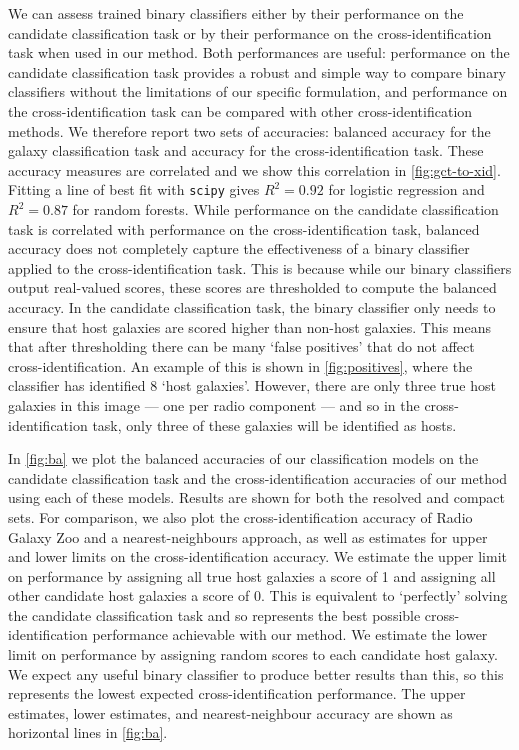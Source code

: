     {We can assess trained binary classifiers either by their performance on
    the candidate classification task or by their performance on the
    cross-identification task when used in our method. Both performances are
    useful: performance on the candidate classification task provides a robust
    and simple way to compare binary classifiers without the limitations of
    our specific formulation, and performance on the cross-identification task
    can be compared with other cross-identification methods. We therefore
    report two sets of accuracies: balanced accuracy for the galaxy
    classification task and accuracy for the cross-identification task. These
    accuracy measures are correlated and we show this correlation in
    \autoref{fig:gct-to-xid}. Fitting a line of best fit with \texttt{scipy}
    gives $R^2 = 0.92$ for logistic regression and $R^2 = 0.87$ for random
    forests. While performance on the candidate classification task is correlated
    with performance on the cross-identification task, balanced accuracy does
    not completely capture the effectiveness of a binary classifier applied to
    the cross-identification task. {This is because while our binary
    classifiers output real-valued scores, these scores are thresholded to
    compute the balanced accuracy}. In the candidate classification
    task, the binary classifier only needs to ensure that host galaxies are
    {scored higher} than non-host galaxies. This means
    {that after thresholding} there can be
    many `false positives' that do not affect cross-identification. An example
    of this is shown in \autoref{fig:positives}, where the classifier has
    identified 8 `host galaxies'. However, there are only three true host
    galaxies in this image --- one per radio component --- and so in the
    cross-identification task, only three of these galaxies will be identified
    as hosts.}

    In \autoref{fig:ba} we plot {the balanced accuracies of our classification models
    on the candidate classification task and the cross-identification
    accuracies of our method using each of these models. Results are shown for both
    the resolved and compact sets.} For comparison, we also plot the cross-identification accuracy of Radio Galaxy
    Zoo and a nearest-neighbours approach, as well as estimates for upper and
    lower limits on the cross-identification accuracy. {We estimate the upper limit on performance by assigning all
    true host galaxies a score of 1 and
    assigning all other candidate host galaxies a score of 0. This
    is equivalent to `perfectly' solving the candidate classification task and so
    represents the best possible cross-identification performance achievable
    with our method. We estimate the lower limit on performance by {
    assigning random scores to each candidate host galaxy}. We expect any
    useful binary classifier to produce better
    results than this, so this represents the lowest expected
    cross-identification performance.} The upper estimates, lower estimates,
    and nearest-neighbour accuracy are shown as horizontal lines in
    \autoref{fig:ba}.

